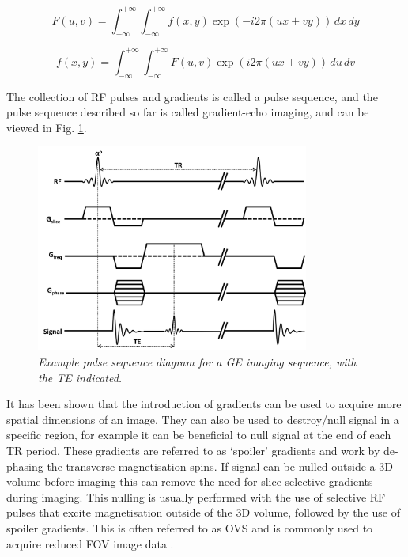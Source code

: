 \begin{equation}
    F(u,v) = \int_{-\infty}^{+\infty}\int_{-\infty}^{+\infty} f(x,y) \exp(-i2\pi (ux+vy)) \,dx \,dy
    \label{eqn:theory:2Dfourier}
\end{equation}

\begin{equation}
    f(x,y) = \int_{-\infty}^{+\infty}\int_{-\infty}^{+\infty} F(u,v) \exp(i2\pi (ux+vy)) \,du \,dv
    \label{eqn:theory:2Dinverse}
\end{equation}

The collection of \ac{RF} pulses and gradients is called a pulse sequence, and the pulse sequence described so far is called gradient-echo imaging, and can be viewed in Fig. \ref{fig:theory:GRE}.

\begin{figure}
    \centering
    \includegraphics[width=0.8\textwidth]{Figures/Theory/GRE_sequence.png}
    \caption{\textit{Example pulse sequence diagram for a \ac{GE} imaging sequence, with the \ac{TE} indicated.}}
    \label{fig:theory:GRE}
\end{figure}

It has been shown that the introduction of gradients can be used to acquire more spatial dimensions of an image. They can also be used to destroy/null signal in a specific region, for example it can be beneficial to null signal at the end of each \ac{TR} period. These gradients are referred to as `spoiler' gradients and work by de-phasing the transverse magnetisation spins. If signal can be nulled outside a 3D volume before imaging this can remove the need for slice selective gradients during imaging. This nulling is usually performed with the use of selective \ac{RF} pulses that excite magnetisation outside of the 3D volume, followed by the use of spoiler gradients. This is often referred to as \ac{OVS} and is commonly used to acquire reduced \ac{FOV} image data \cite{Smith2012ReducedSuppression}.

